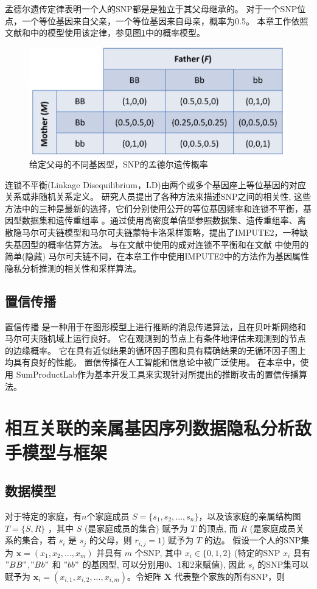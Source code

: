 孟德尔遗传定律表明一个人的SNP都是是独立于其父母继承的。 对于一个SNP位点，一个等位基因来自父亲，一个等位基因来自母亲，概率为0.5。 本章工作依照文献\cite{humbert2013addressing}和\cite{deznabi2018inference}中的模型使用该定律，参见图\ref{fig:Mendelian-law}中的概率模型。

\begin{figure}[htbp]
	\centering
	\includegraphics[width=0.6\linewidth]{./figures/Mendelian-law.jpg}
	\centering
	\caption{给定父母的不同基因型，SNP的孟德尔遗传概率}\label{fig:Mendelian-law}
\end{figure}

连锁不平衡(Linkage Disequilibrium，LD)由两个或多个基因座上等位基因的对应关系或非随机关系定义。 研究人员提出了各种方法来描述SNP之间的相关性, 这些方法中的三种是最新的选择，它们分别使用公开的等位基因频率和连锁不平衡，基因型数据集和遗传重组率\cite{samani2015quantifying} 。通过使用高密度单倍型参照数据集、遗传重组率、离散隐马尔可夫链模型和马尔可夫链蒙特卡洛采样策略，提出了IMPUTE2\cite{howie2014impute2}，一种缺失基因型的概率估算方法。 与在文献\cite{humbert2013addressing,humbert2017quantifying}中使用的成对连锁不平衡和在文献\cite{deznabi2018inference} 中使用的简单(隐藏) 马尔可夫链不同，在本章工作中使用IMPUTE2中的方法作为基因属性隐私分析推测的相关性和采样算法。

\subsection{置信传播}

置信传播\cite{kschischang2001factor} 是一种用于在图形模型上进行推断的消息传递算法，且在贝叶斯网络和马尔可夫随机域上运行良好。 它在观测到的节点上有条件地评估未观测到的节点的边缘概率。 它在具有近似结果的循环因子图和具有精确结果的无循环因子图上均具有良好的性能。 置信传播在人工智能和信息论中被广泛使用。 在本章中，使用 SumProductLab作为基本开发工具来实现针对所提出的推断攻击的置信传播算法。

\section{相互关联的亲属基因序列数据隐私分析敌手模型与框架}
\subsection{数据模型}
对于特定的家庭，有$n$个家庭成员 $S=\{s_1,s_2,...,s_n\}$，以及该家庭的亲属结构图 $T=\{S,R\}$ ，其中 $S$ (是家庭成员的集合) 赋予为 $T$ 的顶点, 而 $R$ (是家庭成员关系的集合，若 $s_i$ 是 $s_j$ 的父母，则 $r_{i,j}=1$) 赋予为 $T$ 的边。 假设一个人的SNP集为 $\mathbf{x}=(x_1,x_2,...,x_m)$ 并具有 $m$ 个SNP, 其中 $x_i \in \{0,1,2\}$ (特定的SNP $x_i$ 具有 $"BB"$,$"Bb"$ 和 $"bb"$ 的基因型, 可以分别用0、1和2来赋值), 因此 $s_i$ 的SNP集可以赋予为 $\mathbf{x}_i=(x_{i,1},x_{i,2},...,x_{i,m})$。令矩阵 $\mathbf{X}$ 代表整个家族的所有SNP，则


